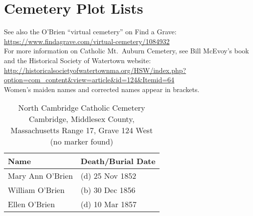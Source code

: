 \chapter{Cemetery Plot Lists}

\setlength{\parindent}{0cm}

See also the O'Brien ``virtual cemetery'' on Find a Grave: \url{https://www.findagrave.com/virtual-cemetery/1084932}
\\[\baselineskip]
For more information on Catholic Mt.\ Auburn Cemetery, see Bill McEvoy's book and the Historical Society of Watertown website: \url{http://historicalsocietyofwatertownma.org/HSW/index.php?option=com_content&view=article&id=124&Itemid=64}
\\[\baselineskip]
Women's maiden names and corrected names appear in brackets.

\begin{table}[ht]
	\centering
		\caption{North Cambridge Catholic Cemetery\cite{DianaBerberenaLetter1:3} \\
		Cambridge, Middlesex County, Massachusetts
		Range 17, Grave 124 West (no marker found)}
	\begin{tabular}{|l|l|}
		\hline
		\textbf{Name} & \textbf{Death/Burial Date} \\
		\hline
	Mary Ann O'Brien\index{O'Brien!Mary Ann\textsuperscript{3} (1852--1852)} & (d) 25 Nov 1852 \\
	\hline
	William O'Brien\index{O'Brien!William\textsuperscript{1}} & (b) 30 Dec 1856 \\
	\hline
	Ellen O'Brien\index{O'Brien!Ellen\textsuperscript{3} (1853--1857)} & (d) 10 Mar 1857 \\
	\hline
	\end{tabular}
\end{table}

